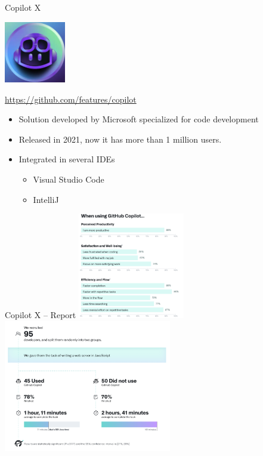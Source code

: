 \documentclass[presentation, 10pt]{beamer}\mode<presentation>{\usetheme{AMSBolognaFC}}
\begin{document}
\begin{frame}{Copilot X}
\begin{center}
\includegraphics[width=0.2\textwidth]{img/copilot-logo.png}

\url{https://github.com/features/copilot}
\end{center}

\begin{itemize}
	\item Solution developed by Microsoft specialized for code development
	\item Released in 2021, now it has more than 1 million users.
	\item Integrated in several IDEs
	\begin{itemize}
		\item Visual Studio Code
		\item IntelliJ
	\end{itemize}
\end{itemize}
\end{frame}
\begin{frame}{Copilot X -- Report}
\includegraphics[width=0.35\textwidth]{img/copilot-report-1.png}
\includegraphics[width=0.55\textwidth]{img/copilot-report-2.png}
\end{frame}
\end{document}
